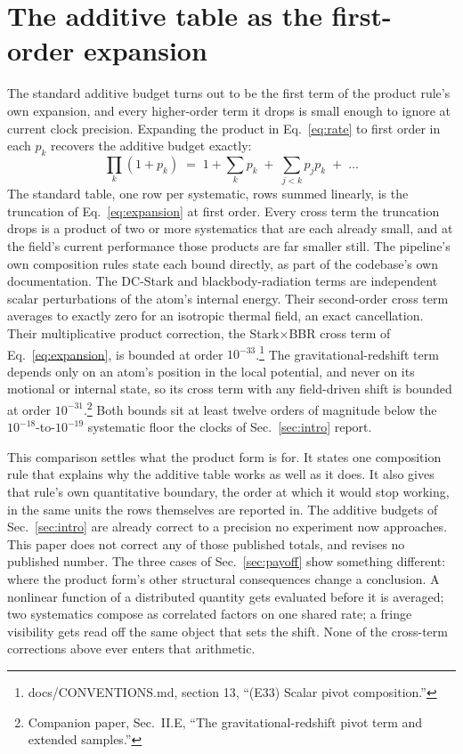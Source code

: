 \documentclass[aps,pra,superscriptaddress,groupedaddress,nofootinbib]{revtex4-2}
\begin{document}
\section{The additive table as the first-order expansion}
\label{sec:equivalence}

The standard additive budget turns out to be the first term of the
product rule's own expansion, and every higher-order term it drops is
small enough to ignore at current clock precision. Expanding the
product in Eq.~\eqref{eq:rate} to first order in each
$p_k$ recovers the additive budget exactly:
\begin{equation}
  \prod_k (1+p_k) \;=\; 1 + \sum_k p_k \;+\; \sum_{j<k} p_j p_k \;+\; \dots
  \label{eq:expansion}
\end{equation}
The standard table, one row per systematic, rows summed linearly, is
the truncation of Eq.~\eqref{eq:expansion} at first order. Every
cross term the truncation drops is a product of two or more
systematics that are each already small, and at the field's current
performance those products are far smaller still. The pipeline's own
composition rules state each bound directly, as part of the
codebase's own documentation. The
DC-Stark and blackbody-radiation terms are independent scalar
perturbations of the atom's internal energy. Their second-order cross
term averages to exactly zero for an isotropic thermal field, an
exact cancellation. Their multiplicative product correction, the
Stark$\times$BBR cross term of Eq.~\eqref{eq:expansion}, is bounded
at order $10^{-33}$.\footnote{docs/CONVENTIONS.md, section 13,
``(E33) Scalar pivot composition.''} The gravitational-redshift term
depends only on an atom's position in the local potential, and never on
its motional or internal state, so its cross term with any
field-driven shift is bounded at order $10^{-31}$.\footnote{Companion
paper, Sec.~II.E, ``The gravitational-redshift pivot term and extended
samples.''} Both bounds sit at least twelve orders of magnitude below the
$10^{-18}$-to-$10^{-19}$ systematic floor the clocks of
Sec.~\ref{sec:intro} report.

This comparison settles what the product form is for. It states one
composition rule that explains why the additive table works as well
as it does. It also gives that rule's own quantitative boundary, the
order at which it would stop working, in the same units the rows
themselves are reported in. The additive budgets of Sec.~\ref{sec:intro}
are already correct to a precision no experiment now approaches. This
paper does not correct any of those published totals, and revises no
published number. The three
cases of Sec.~\ref{sec:payoff} show something different: where the
product form's other structural consequences change a conclusion. A
nonlinear function of a distributed quantity gets evaluated before it
is averaged; two systematics compose as correlated factors on one
shared rate; a fringe visibility gets read off the same object that
sets the
shift. None of the cross-term corrections above ever enters that
arithmetic.
\end{document}
